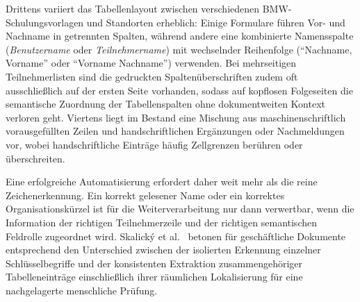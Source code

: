 Drittens variiert das Tabellenlayout zwischen verschiedenen BMW-Schulungsvorlagen und Standorten erheblich: Einige Formulare führen Vor- und Nachname in getrennten Spalten, während andere eine kombinierte Namensspalte (\emph{Benutzername} oder \emph{Teilnehmername}) mit wechselnder Reihenfolge (\enquote{Nachname, Vorname} oder \enquote{Vorname Nachname}) verwenden. Bei mehrseitigen Teilnehmerlisten sind die gedruckten Spaltenüberschriften zudem oft ausschließlich auf der ersten Seite vorhanden, sodass auf kopflosen Folgeseiten die semantische Zuordnung der Tabellenspalten ohne dokumentweiten Kontext verloren geht. Viertens liegt im Bestand eine Mischung aus maschinenschriftlich vorausgefüllten Zeilen und handschriftlichen Ergänzungen oder Nachmeldungen vor, wobei handschriftliche Einträge häufig Zellgrenzen berühren oder überschreiten.

Eine erfolgreiche Automatisierung erfordert daher weit mehr als die reine Zeichenerkennung. Ein korrekt gelesener Name oder ein korrektes Organisationskürzel ist für die Weiterverarbeitung nur dann verwertbar, wenn die Information der richtigen Teilnehmerzeile und der richtigen semantischen Feldrolle zugeordnet wird. Skalický et al.~\cite{Skalicky2022Benchmarks} betonen für geschäftliche Dokumente entsprechend den Unterschied zwischen der isolierten Erkennung einzelner Schlüsselbegriffe und der konsistenten Extraktion zusammengehöriger Tabelleneinträge einschließlich ihrer räumlichen Lokalisierung für eine nachgelagerte menschliche Prüfung.

